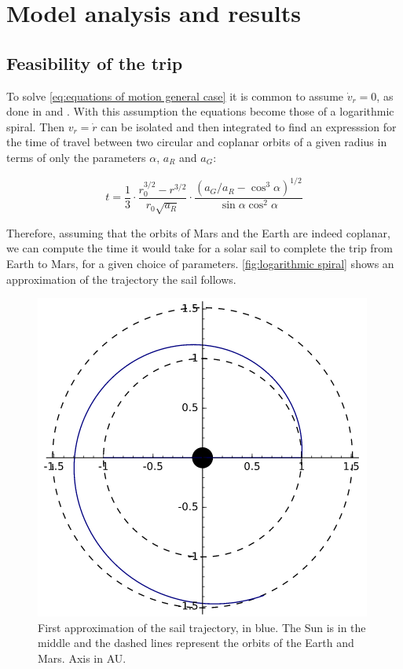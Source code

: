 \documentclass[twocolumn,12pt,a4paper]{article}
\numberwithin{equation}{section}
\begin{document}
\section{Model analysis and results}
\subsection{Feasibility of the trip} \label{sec:Feasibility of the trip}
To solve \autoref{eq:equations of motion general case} it is common to assume \( \dot{v}_r = 0\), as done in \cite{tsu} and \cite{mcinnes}. With this assumption the equations become those of a logarithmic spiral. Then \( v_r = \dot{r} \) can be isolated and then integrated to find an expresssion for the time of travel between two circular and coplanar orbits of a given radius in terms of only the parameters \( \alpha \), \( a_R \) and \( a_G \):

\begin{equation} \label{eq:time of flight between orbits}
	t=\frac{1}{3}\cdot\frac{r_0^{3/2}-r^{3/2}}{r_0\sqrt{a_R}}\cdot\frac{(a_G/a_R-\cos^3\alpha)^{1/2}}{\sin\alpha\cos^2\alpha}
\end{equation}

Therefore, assuming that the orbits of Mars and the Earth are indeed coplanar, we can compute the time it would take for a solar sail to complete the trip from Earth to Mars, for a given choice of parameters. \autoref{fig:logarithmic spiral} shows an approximation of the trajectory the sail follows.

\begin{figure}
	\centering
	\includegraphics[scale=0.5]{espiral.png}
	\caption{First approximation of the sail trajectory, in blue. The Sun is in the middle and the dashed lines represent the orbits of the Earth and Mars. Axis in AU.}
	\label{fig:logarithmic spiral}
\end{figure}
\end{document}
